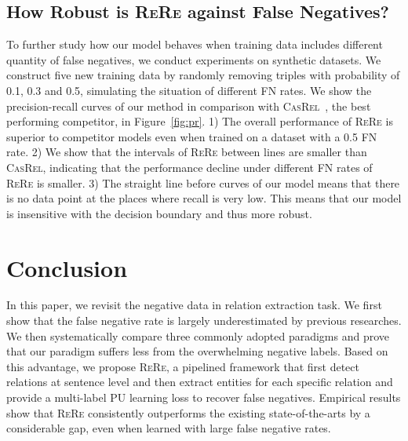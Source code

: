 \documentclass[11pt,a4paper]{article}
\newcommand{\mymethod}[0]{\textsc{ReRe} }
\begin{document}
\subsection{How Robust is \mymethod against False Negatives?}

To further study how our model behaves when training data includes different quantity of false negatives, we conduct experiments on synthetic datasets.
We construct five new training data by randomly removing triples with probability of 0.1, 0.3 and 0.5, simulating the situation of different FN rates.
We show the precision-recall curves of our method in comparison with \textsc{CasRel}~\cite{Wei2020ANC}, the best performing competitor, in Figure~\ref{fig:pr}.
1) The overall performance of \mymethod is superior to competitor models even when trained on a dataset with a 0.5 FN rate.
2) We show that the intervals of \mymethod between lines are smaller than \textsc{CasRel}, indicating that the performance decline under different FN rates of \mymethod is smaller.
3) The straight line before curves of our model means that there is no data point at the places where recall is very low.
This means that our model is insensitive with the decision boundary and thus more robust. 







\section{Conclusion}
In this paper, we revisit the negative data in relation extraction task.
We first show that the false negative rate is largely underestimated by previous researches.
We then systematically compare three commonly adopted paradigms and prove that our paradigm suffers less from the overwhelming negative labels.
Based on this advantage, we propose \textsc{ReRe}, a pipelined framework that first detect relations at sentence level and then extract entities for each specific relation and provide a multi-label PU learning loss to recover false negatives.
Empirical results show that \mymethod consistently outperforms the existing state-of-the-arts by a considerable gap, even when learned with large false negative rates.







\end{document}
